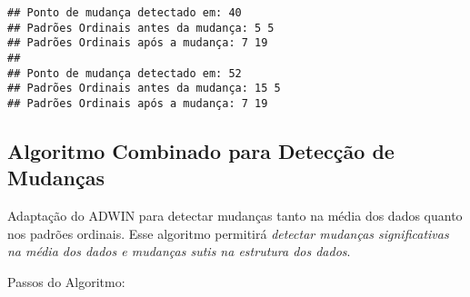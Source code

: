 \documentclass[
]{article}
\newenvironment{Shaded}{\begin{snugshade}}{\end{snugshade}}
\newcommand{\ControlFlowTok}[1]{\textcolor[rgb]{0.13,0.29,0.53}{\textbf{#1}}}
\newcommand{\DecValTok}[1]{\textcolor[rgb]{0.00,0.00,0.81}{#1}}
\newcommand{\FunctionTok}[1]{\textcolor[rgb]{0.13,0.29,0.53}{\textbf{#1}}}
\newcommand{\NormalTok}[1]{#1}
\newcommand{\SpecialCharTok}[1]{\textcolor[rgb]{0.81,0.36,0.00}{\textbf{#1}}}
\newcommand{\StringTok}[1]{\textcolor[rgb]{0.31,0.60,0.02}{#1}}
\begin{document}
\begin{Shaded}
\end{Shaded}

\begin{verbatim}
## Ponto de mudança detectado em: 40 
## Padrões Ordinais antes da mudança: 5 5 
## Padrões Ordinais após a mudança: 7 19 
## 
## Ponto de mudança detectado em: 52 
## Padrões Ordinais antes da mudança: 15 5 
## Padrões Ordinais após a mudança: 7 19
\end{verbatim}

\hypertarget{algoritmo-combinado-para-detecuxe7uxe3o-de-mudanuxe7as}{%
\subsection{Algoritmo Combinado para Detecção de
Mudanças}\label{algoritmo-combinado-para-detecuxe7uxe3o-de-mudanuxe7as}}

Adaptação do ADWIN para detectar mudanças tanto na média dos dados
quanto nos padrões ordinais. Esse algoritmo permitirá \emph{detectar
mudanças significativas na média dos dados e mudanças sutis na estrutura
dos dados}.

Passos do Algoritmo:
\end{document}
